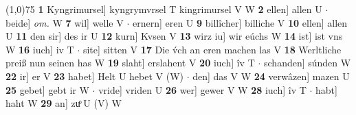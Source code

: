 \documentclass[8pt,a4paper,notitlepage]{article}
\begin{document}
\begin{table}[ht]
\begin{minipage}[t]{0.5\linewidth}
\line(1,0){75} \newline
\textbf{1} Kyngrimursel] kyngrymvrsel T kingrimursel V W \textbf{2} ellen] allen U  $\cdot$ beide] \textit{om.} W \textbf{7} wil] welle V  $\cdot$ ernern] eren U \textbf{9} billîcher] billiche V \textbf{10} ellen] allen U \textbf{11} den sir] des ir U \textbf{12} kurn] Kvsen V \textbf{13} wirz iu] wir eúchs W \textbf{14} ist] ist vns W \textbf{16} iuch] iv T  $\cdot$ site] sitten V \textbf{17} Die v́ch an eren machen las V \textbf{18} Werltliche preiß nun seinen has W \textbf{19} slaht] erslahent V \textbf{20} iuch] îv T  $\cdot$ schanden] súnden W \textbf{22} ir] er V \textbf{23} habet] Helt U hebet V (W)  $\cdot$ den] das V W \textbf{24} verwâzen] mazen U \textbf{25} gebet] gebt ir W  $\cdot$ vride] vriden U \textbf{26} wer] gewer V W \textbf{28} iuch] îv T  $\cdot$ habt] haht W \textbf{29} an] zuͦ U (V) W \newline
\end{minipage}
\end{table}
\end{document}
